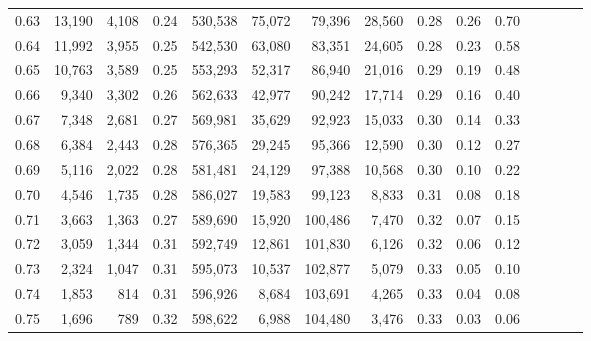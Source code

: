 \begin{tabular}{rrrcrrrrrrrrrrr}
0.63 &  13,190 &  4,108 &                                       0.24 &  530,538 &   75,072 &   79,396 &   28,560 &  0.28 &  0.26 &                         0.70 \\
0.64 &  11,992 &  3,955 &                                       0.25 &  542,530 &   63,080 &   83,351 &   24,605 &  0.28 &  0.23 &                         0.58 \\
0.65 &  10,763 &  3,589 &                                       0.25 &  553,293 &   52,317 &   86,940 &   21,016 &  0.29 &  0.19 &                         0.48 \\
0.66 &   9,340 &  3,302 &                                       0.26 &  562,633 &   42,977 &   90,242 &   17,714 &  0.29 &  0.16 &                         0.40 \\
0.67 &   7,348 &  2,681 &                                       0.27 &  569,981 &   35,629 &   92,923 &   15,033 &  0.30 &  0.14 &                         0.33 \\
0.68 &   6,384 &  2,443 &                                       0.28 &  576,365 &   29,245 &   95,366 &   12,590 &  0.30 &  0.12 &                         0.27 \\
0.69 &   5,116 &  2,022 &                                       0.28 &  581,481 &   24,129 &   97,388 &   10,568 &  0.30 &  0.10 &                         0.22 \\
0.70 &   4,546 &  1,735 &                                       0.28 &  586,027 &   19,583 &   99,123 &    8,833 &  0.31 &  0.08 &                         0.18 \\
0.71 &   3,663 &  1,363 &                                       0.27 &  589,690 &   15,920 &  100,486 &    7,470 &  0.32 &  0.07 &                         0.15 \\
0.72 &   3,059 &  1,344 &                                       0.31 &  592,749 &   12,861 &  101,830 &    6,126 &  0.32 &  0.06 &                         0.12 \\
0.73 &   2,324 &  1,047 &                                       0.31 &  595,073 &   10,537 &  102,877 &    5,079 &  0.33 &  0.05 &                         0.10 \\
0.74 &   1,853 &    814 &                                       0.31 &  596,926 &    8,684 &  103,691 &    4,265 &  0.33 &  0.04 &                         0.08 \\
0.75 &   1,696 &    789 &                                       0.32 &  598,622 &    6,988 &  104,480 &    3,476 &  0.33 &  0.03 &                         0.06 \\

\end{tabular}
